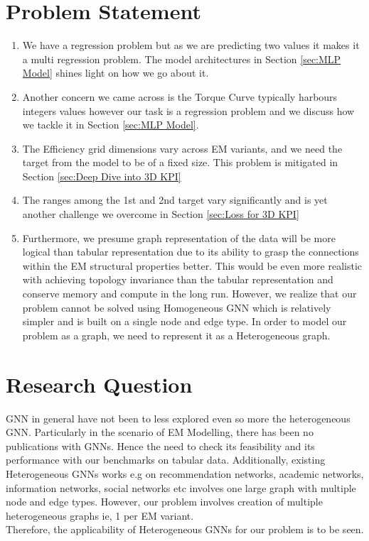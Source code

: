 \documentclass{report} %
\begin{document}
\section{Problem Statement}\label{sec:Problem Statement}

\begin{enumerate}

    \item We have a regression problem but as we are predicting two values it makes it a multi regression problem. The model architectures in Section \ref{sec:MLP Model} shines light on how we go about it.
    \item Another concern we came across is the Torque Curve typically harbours integers values however our task is a regression problem and we discuss how we tackle it in Section \ref{sec:MLP Model}. 
    \item The Efficiency grid dimensions vary across \ac{EM} variants, and we need the target from the model to be of a fixed size. This problem is mitigated in Section \ref{sec:Deep Dive into 3D KPI}
    \item The ranges among the 1st and 2nd target vary significantly and is yet another challenge we overcome in Section \ref{sec:Loss for 3D KPI}
    \item Furthermore, we presume graph representation of the data will be more logical than tabular representation due to its ability to grasp the connections within the \ac{EM} structural properties better.
    This would be even more realistic with achieving topology invariance than the tabular representation and conserve memory and compute in the long run.
    However, we realize that our problem cannot be solved using Homogeneous \ac{GNN} which is relatively simpler and is built on a single node and edge type.
    In order to model our problem as a graph, we need to represent it as a Heterogeneous graph. \\

\end{enumerate}

\section{Research Question}\label{sec:Research Question}
\ac{GNN} in general have not been to less explored even so more the heterogeneous \ac{GNN}.
Particularly in the scenario of \ac{EM} Modelling, there has been no publications with \ac{GNN}s.
Hence the need to check its feasibility and its performance with our benchmarks on tabular data.
Additionally, existing Heterogeneous \ac{GNN}s works e.g on recommendation networks, academic networks, information networks, social networks etc involves one large graph with multiple node and edge types. 
However, our problem involves creation of multiple heterogeneous graphs ie, 1 per \ac{EM} variant.\\
Therefore, the applicability of Heterogeneous \ac{GNN}s for our problem is to be seen.\\
\end{document}
